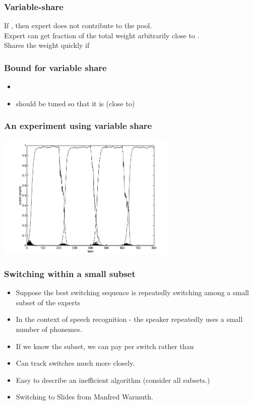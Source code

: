 \documentclass[handout]{beamer}
\begin{document}
\begin{frame}
\frametitle{Variable-share}
\pause
If , then expert  does not contribute to the pool.\\
\pause
Expert can get fraction of the total weight arbitrarily close to .\\
\pause
Shares the weight quickly if 
\end{frame}

\begin{frame}
\frametitle{Bound for variable share}
\begin{itemize}
\item
{}
\item \R{$\alpha$} should be tuned so that it is (close to) 
\end{itemize}
\end{frame}

\begin{frame}
\frametitle{An experiment using variable share}
\includegraphics[height=6cm]{figures/VariableShareFigure.jpg}
\end{frame}

\begin{frame}
\frametitle{Switching within a small subset}
\begin{itemize}
\item Suppose the best switching sequence is repeatedly switching among a small subset of the experts
\item In the context of speech recognition - the speaker repeatedly uses a small number of phonemes.
\item If we know the subset, we can pay  per switch rather than 
\item Can track switches much more closely.
\item Easy to describe an inefficient algorithm (consider all  subsets.)
\item Switching to Slides from Manfred Warmuth.
\end{itemize}
\end{frame}

%
\end{document}
